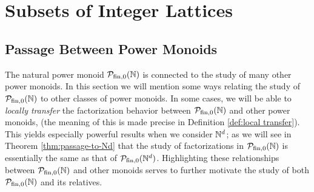 
\chapter{Subsets of Integer Lattices} \label{ch:lattices}
\section{Passage Between Power Monoids}\label{sec:passage}


The natural power monoid ${\mathcal{P}_{\textrm{fin},0}(\mathbb{N})}$ is connected to the study of many other power monoids.
In this section we will mention some ways relating the study of ${\mathcal{P}_{\textrm{fin},0}(\mathbb{N})}$ to other classes of power monoids.
In some cases, we will be able to \textit{locally transfer} the factorization behavior between ${\mathcal{P}_{\textrm{fin},0}(\mathbb{N})}$ and other power monoids, (the meaning of this is made precise in Definition \ref{def:local transfer}).
This yields especially powerful results when we consider $\mathbb{N}^d$; as we will see in Theorem \ref{thm:passage-to-Nd} that the study of factorizations in ${\mathcal{P}_{\textrm{fin},0}(\mathbb{N})}$ is essentially the same as that of $\mathcal{P}_{\textrm{fin}, 0}(\mathbb{N}^d)$.
Highlighting these relationships between ${\mathcal{P}_{\textrm{fin},0}(\mathbb{N})}$ and other monoids serves to further motivate the study of both ${\mathcal{P}_{\textrm{fin},0}(\mathbb{N})}$ and its relatives.






